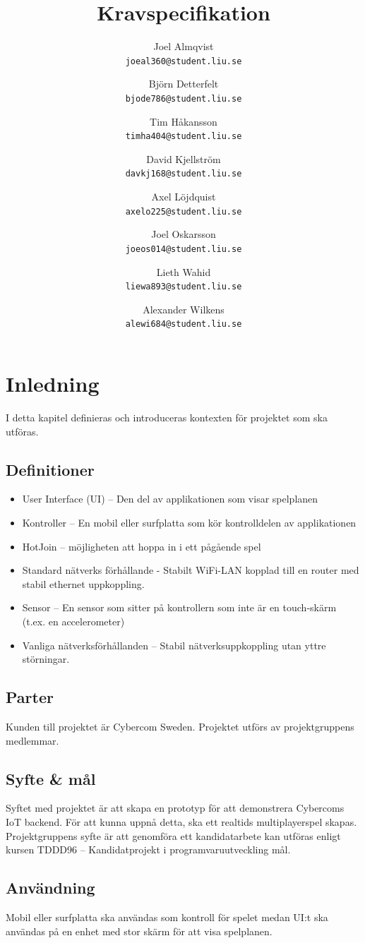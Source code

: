 \documentclass[10pt]{article}
\title{Kravspecifikation}
\author{
    Joel Almqvist\\
    \texttt{joeal360@student.liu.se}
    \and
    Björn Detterfelt\\
    \texttt{bjode786@student.liu.se}
    \and
    Tim Håkansson\\
    \texttt{timha404@student.liu.se}
    \and
    David Kjellström\\
    \texttt{davkj168@student.liu.se}
    \and
    Axel Löjdquist\\
    \texttt{axelo225@student.liu.se}
    \and
    Joel Oskarsson\\
    \texttt{joeos014@student.liu.se}
    \and
    Lieth Wahid\\
    \texttt{liewa893@student.liu.se}
    \and
    Alexander Wilkens\\
    \texttt{alewi684@student.liu.se}
}
\begin{document}
\maketitle
\pagebreak
\tableofcontents
\pagebreak
\section{Inledning}
	I detta kapitel definieras och introduceras kontexten för projektet som ska utföras.

	\subsection{Definitioner}
		\begin{itemize}
		\item User Interface (UI) -- Den del av applikationen som visar spelplanen
		\item Kontroller -- En mobil eller surfplatta som kör kontrolldelen av applikationen
		\item HotJoin -- möjligheten att hoppa in i ett pågående spel
		\item Standard nätverks förhållande - Stabilt WiFi-LAN kopplad till en router med stabil ethernet uppkoppling.
		\item Sensor -- En sensor som sitter på kontrollern som inte är en touch-skärm (t.ex. en accelerometer)
		\item Vanliga nätverksförhållanden -- Stabil nätverksuppkoppling utan yttre störningar.
		\end{itemize}	

	\subsection{Parter}
	Kunden till projektet är Cybercom Sweden. Projektet utförs av projektgruppens medlemmar.
	\subsection{Syfte \& mål}
		Syftet med projektet är att skapa en prototyp för att demonstrera Cybercoms IoT backend. För att kunna uppnå detta, ska ett realtids multiplayerspel skapas. Projektgruppens syfte är att genomföra ett kandidatarbete kan utföras enligt kursen TDDD96 -- Kandidatprojekt i programvaruutveckling mål.
	
	\subsection{Användning}
		Mobil eller surfplatta ska användas som kontroll för spelet medan UI:t ska användas på en enhet med stor skärm för att visa spelplanen.
	
\end{document}
